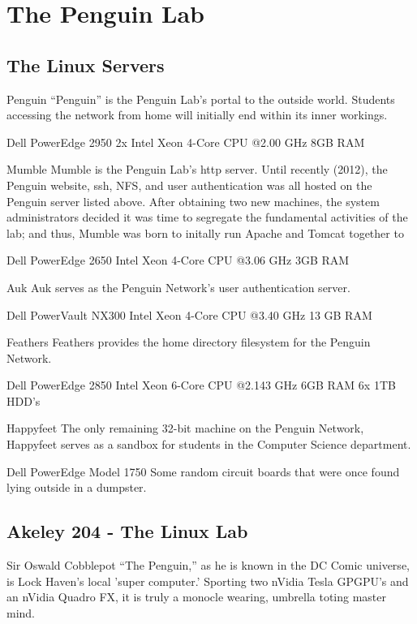 \section*{The Penguin Lab}


\subsection*{The Linux Servers}
Penguin
    ``Penguin'' is the Penguin Lab's portal to the outside world.  Students accessing the network from home will initially end within its inner workings.

    Dell PowerEdge 2950
    2x  Intel Xeon 4-Core CPU @2.00 GHz
    8GB RAM

Mumble
    Mumble is the Penguin Lab's http server.  Until recently (2012), the Penguin website, ssh, NFS, and user authentication was all hosted on the Penguin server listed above.  After obtaining two new machines, the system administrators decided it was time to segregate the fundamental activities of the lab; and thus, Mumble was born to initally run Apache and Tomcat together to 
    
    Dell PowerEdge 2650
    Intel Xeon 4-Core CPU @3.06 GHz
    3GB RAM

Auk
    Auk serves as the Penguin Network's user authentication server.

    Dell PowerVault NX300
    Intel Xeon 4-Core CPU @3.40 GHz
    13 GB RAM

Feathers
    Feathers provides the home directory filesystem for the Penguin Network.

    Dell PowerEdge 2850
    Intel Xeon 6-Core CPU @2.143 GHz
    6GB RAM
    6x  1TB HDD's

Happyfeet
    The only remaining 32-bit machine on the Penguin Network, Happyfeet serves as a sandbox for students in the Computer Science department. 

    Dell PowerEdge Model 1750
    Some random circuit boards that were once found lying outside in a dumpster.

\subsection*{Akeley 204 - The Linux Lab}
Sir Oswald Cobblepot
    ``The Penguin,'' as he is known in the DC Comic universe, is Lock Haven's local 'super computer.'  Sporting two nVidia Tesla GPGPU's and an nVidia Quadro FX, it is truly a monocle wearing, umbrella toting master mind.

